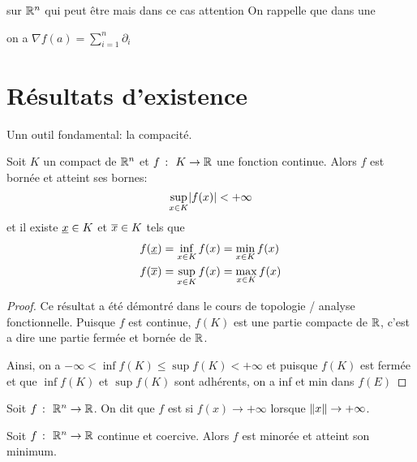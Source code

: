 sur \(\mathbb{R}^n\) qui peut être %
mais dans ce cas attention
On rappelle que dans une

on a \(\nabla f(a) = \sum_{i=1}^n \partial_i\)

\section{Résultats d'existence}

Unn outil fondamental: la compacité.

\begin{theorem}
    Soit \(K\) un compact de \(\mathbb{R}^n\) et \(f\ \colon\ K\to\mathbb{R}\)
    une fonction continue. Alors \(f\) est bornée et atteint ses
    bornes:
    \begin{equation*}
        \sup_{x\in K} \mathopen{}\left|f(x)\right|\mathclose{} < +\infty
    \end{equation*}
    et il existe \(\underline{x}\in K\) et \(\overline{x} \in K\) tels que
    \begin{equation*}
        \begin{aligned}
            &f(\underline{x}) = \inf_{x\in K} f(x) = \min_{x\in K} f(x)\\
            &f(\overline{x}) = \sup_{x\in K} f(x) = \max_{x\in K} f(x)
        \end{aligned}
    \end{equation*}
\end{theorem}

\begin{proof}
    Ce résultat a été démontré dans le cours de topologie / analyse
    fonctionnelle. Puisque \(f\) est continue, \(f(K)\) est une partie compacte de \(\mathbb{R}\),
    c'est a dire une partie fermée et bornée de \(\mathbb{R}\).

    Ainsi, on a \(-\infty < \inf f(K) \leq \sup f(K) < +\infty\)
    et puisque \(f(K)\) est fermée et que \(\inf f(K)\) et \(\sup f(K)\)
    sont adhérents, on a inf et min dans \(f(E)\) %
\end{proof}

\begin{definition}
    Soit \(f\ \colon\ \mathbb{R}^n\to\mathbb{R}\). On dit que \(f\) est 
    si \(f(x) \to +\infty\) lorsque \(\mathopen{}\left\|x\right\|\mathclose{}\to +\infty\).
\end{definition}

\begin{theorem}
    Soit \(f\ \colon\ \mathbb{R}^n\to\mathbb{R}\) continue et coercive. Alors \(f\) est minorée
    et atteint son minimum.
\end{theorem}

